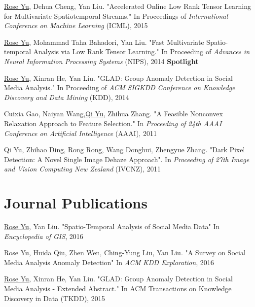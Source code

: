\documentclass[margin,line]{res}
\begin{document}
\begin{resume}
\begin{enumerate}[label={[C\arabic*]}]
\item \underline{Rose Yu}, Dehua Cheng, Yan Liu. "Accelerated Online Low Rank Tensor Learning for Multivariate Spatiotemporal Streams." In Proceedings  of  \textit{International Conference on Machine Learning} (ICML), 2015

\item \underline{Rose Yu}, Mohammad Taha Bahadori, Yan Liu. "Fast Multivariate Spatio-temporal Analysis via Low Rank Tensor Learning." In Proceeding of  \textit{Advances in Neural Information Processing Systems} (NIPS), 2014 \textbf{Spotlight}

\item \underline{Rose Yu}, Xinran He, Yan Liu. "GLAD: Group Anomaly Detection in Social Media Analysis." In Proceeding of  \textit{ACM SIGKDD Conference on Knowledge Discovery and Data Mining} (KDD), 2014

\item Cuixia Gao, Naiyan Wang,\underline{Qi Yu}, Zhihua Zhang. "A Feasible Nonconvex Relaxation Approach to Feature Selection." In \textit{Proceeding of 24th AAAI Conference on Artificial Intelligence} (AAAI), 2011 

\item  \underline{Qi Yu}, Zhihao Ding, Rong Rong, Wang Donghui, Zhengyue Zhang. "Dark Pixel Detection: A Novel Single Image Dehaze Approach". In \textit{Proceeding of 27th Image and Vision Computing New Zealand }(IVCNZ), 2011  
\end{enumerate}

 
\section{\sc Journal Publications}
\begin{enumerate}[label={[J\arabic*]}]
\item \underline{Rose Yu},  Yan Liu.  "Spatio-Temporal Analysis of Social Media Data"  In \textit{Encyclopedia of GIS}, 2016

\item \underline{Rose Yu}, Huida Qiu, Zhen Wen, Ching-Yung Liu,  Yan Liu. "A Survey on Social Media Analysis  Anomaly Detection" In \textit{ACM KDD Exploration},  2016

\item \underline{Rose Yu}, Xinran He, Yan Liu. "GLAD: Group Anomaly Detection in Social Media Analysis - Extended Abstract." In \textit{}ACM Transactions on Knowledge Discovery in Data  (TKDD), 2015
\end{enumerate}


\end{resume}
\end{document}
